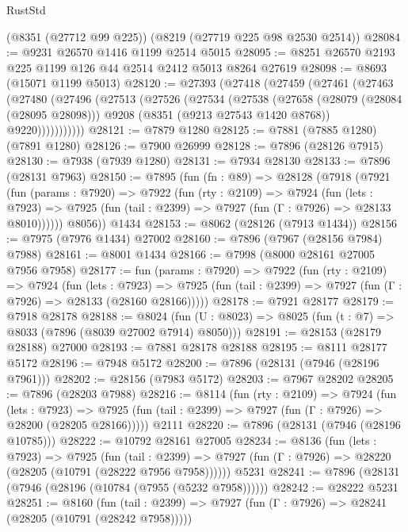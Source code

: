 \begin{lexlean}{RustStd}
\begin{coremodule}
    (@8351 (@27712 @99 @225))
    (@8219 (@27719 @225 @98 @2530 @2514))
@28084 := @9231 @26570 @1416 @1199 @2514 @5015
@28095 := @8251 @26570 @2193 @225 @1199 @126 @44 @2514 @2412 @5013 @8264 @27619
@28098 := @8693 (@15071 @1199 @5013)
@28120 := @27393
    (@27418
      (@27459
        (@27461
          (@27463
            (@27480
              (@27496
                (@27513
                  (@27526
                    (@27534
                      (@27538
                        (@27658
                          (@28079 (@28084 (@28095 @28098)))
                          @9208
                          (@8351 (@9213 @27543 @1420 @8768))
                          @9220)))))))))))
@28121 := @7879 @1280
@28125 := @7881 (@7885 @1280) (@7891 @1280)
@28126 := @7900 @26999
@28128 := @7896 (@28126 @7915)
@28130 := @7938 (@7939 @1280)
@28131 := @7934 @28130
@28133 := @7896 (@28131 @7963)
@28150 := @7895
    (fun (fn : @89) =>
    @28128
      (@7918
        (@7921
          (fun (params : @7920) =>
          @7922
            (fun (rty : @2109) =>
            @7924
              (fun (lets : @7923) =>
              @7925 (fun (tail : @2399) => @7927 (fun (Γ : @7926) => @28133 @8010))))))
        @8056))
    @1434
@28153 := @8062 (@28126 (@7913 @1434))
@28156 := @7975 (@7976 @1434) @27002
@28160 := @7896 (@7967 (@28156 @7984) @7988)
@28161 := @8001 @1434
@28166 := @7998 (@8000 @28161 @27005 @7956 @7958)
@28177 := fun (params : @7920) =>
  @7922
    (fun (rty : @2109) =>
    @7924
      (fun (lets : @7923) =>
      @7925 (fun (tail : @2399) => @7927 (fun (Γ : @7926) => @28133 (@28160 @28166)))))
@28178 := @7921 @28177
@28179 := @7918 @28178
@28188 := @8024
    (fun (U : @8023) => @8025 (fun (t : @7) => @8033 (@7896 (@8039 @27002 @7914) @8050)))
@28191 := @28153 (@28179 @28188) @27000
@28193 := @7881 @28178 @28188
@28195 := @8111 @28177 @5172
@28196 := @7948 @5172
@28200 := @7896 (@28131 (@7946 (@28196 @7961)))
@28202 := @28156 (@7983 @5172)
@28203 := @7967 @28202
@28205 := @7896 (@28203 @7988)
@28216 := @8114
    (fun (rty : @2109) =>
    @7924
      (fun (lets : @7923) =>
      @7925 (fun (tail : @2399) => @7927 (fun (Γ : @7926) => @28200 (@28205 @28166)))))
    @2111
@28220 := @7896 (@28131 (@7946 (@28196 @10785)))
@28222 := @10792 @28161 @27005
@28234 := @8136
    (fun (lets : @7923) =>
    @7925
      (fun (tail : @2399) =>
      @7927 (fun (Γ : @7926) => @28220 (@28205 (@10791 (@28222 @7956 @7958))))))
    @5231
@28241 := @7896 (@28131 (@7946 (@28196 (@10784 (@7955 (@5232 @7958))))))
@28242 := @28222 @5231
@28251 := @8160
    (fun (tail : @2399) => @7927 (fun (Γ : @7926) => @28241 (@28205 (@10791 (@28242 @7958)))))

\end{coremodule}
\end{lexlean}
